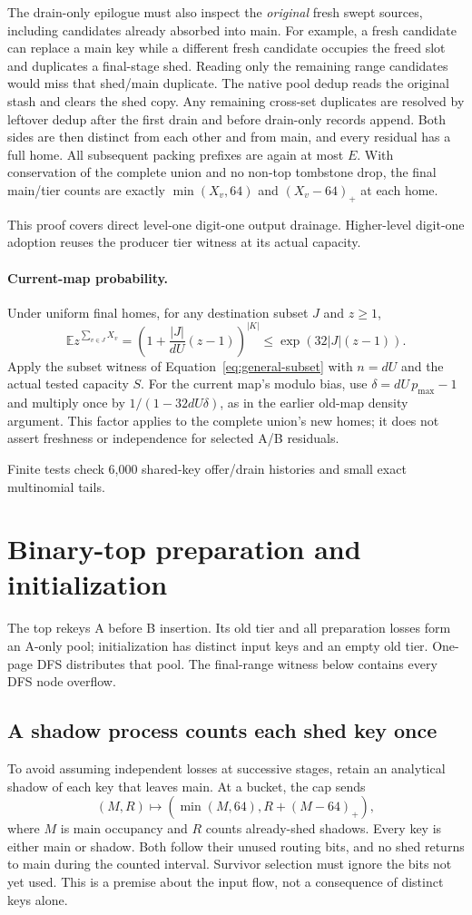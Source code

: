 \documentclass[11pt]{article}
\theoremstyle{definition}
\theoremstyle{remark}
\newcommand{\E}{\mathbb E}
\begin{document}
The drain-only epilogue must also inspect the \emph{original} fresh swept
sources, including candidates already absorbed into main. For example, a
fresh candidate can replace a main key while a different fresh candidate
occupies the freed slot and duplicates a final-stage shed. Reading only
the remaining range candidates would miss that shed/main duplicate. The
native pool dedup reads the original stash and clears the shed copy.
Any remaining cross-set duplicates are resolved by leftover dedup after
the first drain and before drain-only records append. Both sides are then
distinct from each other and from main, and every residual has a full home.
All subsequent packing prefixes are again at most $E$. With conservation
of the complete union and no non-top tombstone drop, the final main/tier
counts are exactly $\min(X_v,64)$ and $(X_v-64)_+$ at each home.

This proof covers direct level-one digit-one output drainage. Higher-level
digit-one adoption reuses the producer tier witness at its actual capacity.

\paragraph{Current-map probability.}
Under uniform final homes, for any destination subset $J$ and $z\ge1$,
\[
 \E z^{\sum_{v\in J}X_v}
 =\left(1+\frac{|J|}{dU}(z-1)\right)^{|K|}
 \le \exp(32|J|(z-1)).
\]
Apply the subset witness of Equation~\eqref{eq:general-subset} with
$n=dU$ and the actual tested capacity $S$. For the current map's modulo
bias, use $\delta=dU\,p_{\max}-1$ and multiply once by
$1/(1-32dU\delta)$, as in the earlier old-map density argument. This
factor applies to the complete union's new homes; it does not assert
freshness or independence for selected A/B residuals.

Finite tests check 6,000 shared-key
offer/drain histories and small exact multinomial tails.

\section{Binary-top preparation and initialization}
The top rekeys A before B insertion. Its old tier and all preparation
losses form an A-only pool; initialization has distinct input keys and
an empty old tier. One-page DFS distributes that pool. The final-range
witness below contains every DFS node overflow.
\subsection{A shadow process counts each shed key once}
To avoid assuming independent losses at successive stages, retain an
analytical shadow of each key that leaves main. At a bucket, the cap sends
\[
 (M,R)\longmapsto(\min(M,64),R+(M-64)_+),
\]
where $M$ is main occupancy and $R$ counts already-shed shadows. Every key
is either main or shadow. Both follow their unused routing bits, and no
shed returns to main during the counted interval. Survivor selection must
ignore the bits not yet used. This is a premise about the input flow,
not a consequence of distinct keys alone.
\end{document}
